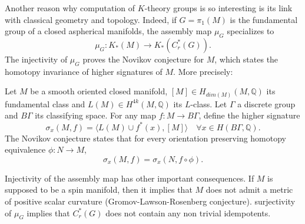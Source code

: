 Another reason why computation of $K$-theory groups is so interesting is its link with classical geometry and topology. Indeed, if $G=\pi_1(M)$ is the fundamental group of a closed aspherical manifolds, the assembly map $\mu_G$ specializes to 
\[\mu_G : K_*(M)\rightarrow K_*(C^*_r(G)).\]
The injectivity of $\mu_G$ proves the Novikov conjecture for $M$, which states the homotopy invariance of higher signatures of $M$. More precisely:

\begin{conjecture} Let $M$ be a smooth oriented closed manifold, 
$[M]\in H_{dim(M)}(M,\mathbb Q)$ its fundamental class and
$ L(M)\in H^{4k}(M,\mathbb Q)$ its $L$-class. Let $\Gamma$ a discrete group and $B\Gamma$ its classifying space. 
For any map $f: M \rightarrow B\Gamma$, define the higher signature 
\[\sigma_x(M,f) = \langle L(M)\cup f^*(x),[M] \rangle \quad \forall x \in H(B\Gamma, \mathbb Q).\]
The Novikov conjecture states that for every orientation preserving homotopy equivalence $\phi : N\rightarrow M$,
\[\sigma_x(M,f)= \sigma_x(N,f\circ \phi).\]
\end{conjecture}

Injectivity of the assembly map has other important consequences. If $M$ is supposed to be a spin manifold, then it implies that $M$ does not admit a metric of positive scalar curvature (Gromov-Lawson-Rosenberg conjecture). surjectivity of $\mu_G$ implies that $C^*_r(G)$ does not contain any non trivial idempotents.\\

